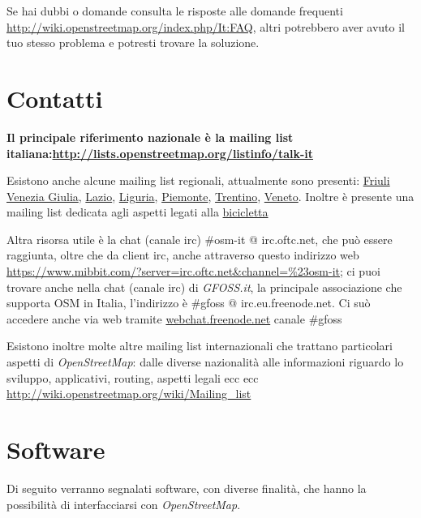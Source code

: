 \documentclass[a4paper,twoside,12pt,]{article}
\newcommand{\osm}{\emph{OpenStreetMap}\xspace}
\newcommand{\pro}[1]{\emph{#1}}
\begin{document}
Se hai dubbi o domande consulta le risposte alle domande frequenti \url{http://wiki.openstreetmap.org/index.php/It:FAQ}, altri potrebbero aver avuto il tuo stesso problema e potresti trovare la soluzione.
\section{Contatti}
\textbf{Il principale riferimento nazionale è la mailing list italiana:\newline \url{http://lists.openstreetmap.org/listinfo/talk-it}}

Esistono anche alcune mailing list regionali, attualmente sono presenti: \href{http://lists.openstreetmap.org/listinfo/talk-it-fvg}{Friuli Venezia Giulia}, \href{http://lists.openstreetmap.org/listinfo/talk-it-lazio}{Lazio}, \href{http://lists.openstreetmap.org/listinfo/talk-it-liguria}{Liguria}, \href{http://lists.openstreetmap.org/listinfo/talk-it-piemonte}{Piemonte}, \href{http://lists.openstreetmap.org/listinfo/talk-it-trentino}{Trentino}, \href{http://liste.remixtj.net/listinfo/osmveneto}{Veneto}. Inoltre è presente una mailing list dedicata agli aspetti legati alla \href{http://lists.openstreetmap.org/listinfo/talk-it-bici}{bicicletta}

Altra risorsa utile è la chat (canale irc) \#osm-it @ irc.oftc.net, che può essere raggiunta, oltre che da client irc, anche attraverso questo indirizzo web \url{https://www.mibbit.com/?server=irc.oftc.net\&channel=\%23osm-it}; ci puoi trovare anche nella chat (canale irc) di \pro{GFOSS.it}, la principale associazione che supporta OSM in Italia, l'indirizzo è \#gfoss @ irc.eu.freenode.net. Ci suò accedere anche via web tramite \url{webchat.freenode.net}  canale \#gfoss

Esistono inoltre molte altre mailing list internazionali che trattano particolari aspetti di \osm: dalle diverse nazionalità alle informazioni riguardo lo sviluppo, applicativi, routing, aspetti legali ecc ecc \url{http://wiki.openstreetmap.org/wiki/Mailing_list}


\section{Software}
Di seguito verranno segnalati software, con diverse finalità, che hanno la possibilità di interfacciarsi con \osm.
\end{document}
